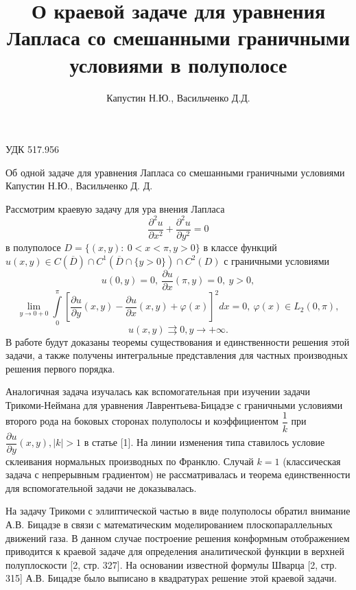 \documentclass[a4paper, 9pt]{article}
\title{О краевой задаче для уравнения Лапласа со смешанными граничными условиями в полуполосе}
\author{Капустин Н.Ю., Васильченко Д.Д.}
\date{}
\begin{document}
	УДК 517.956
	\begin{center}		
		\LARGE{
		 Об одной задаче для уравнения Лапласа со смешанными граничными условиями
		}
		\newline
		\large{Капустин Н.Ю., Васильченко Д. Д.}
		
	\end{center}
	\par
	Рассмотрим краевую задачу для ура внения Лапласа
	\begin{equation}
		\dfrac{\partial^2 u}{\partial x^2} +\dfrac{\partial^2 u}{\partial y^2} = 0
	\end{equation}
	в полуполосе $D = \{(x,y) :\  0 < x < \pi, y > 0\}$	в классе функций $u(x,y) \in C(\overline{D}) \cap C^1(\overline{D} \cap \{y > 0\}) \cap C^2 (D)$ \newline
	с граничными условиями
	\begin{equation}
		u(0, y) = 0, \ \dfrac{\partial u}{\partial x} (\pi, y) = 0, \ y > 0, 
	\end{equation}
	\begin{equation}
		\lim\limits_{y \to 0 + 0} \int\limits_0^\pi \left[\dfrac{\partial u}{\partial y}(x,y) - \dfrac{\partial u}{\partial x}(x,y) + \varphi(x) \right]^2 dx = 0, \ \varphi(x) \in L_2(0,\pi) , 
	\end{equation}
	\begin{equation}
		u(x,y) \rightrightarrows 0, y \to +\infty. 
	\end{equation}
	В работе будут доказаны теоремы существования и единственности решения
	этой задачи, а также получены интегральные представления для частных
	производных решения первого порядка.
	
	Аналогичная задача изучалась как вспомогательная при изучении задачи Трикоми-Неймана
	для уравнения Лаврентьева-Бицадзе с граничными условиями второго рода на боковых сторонах
	полуполосы и коэффициентом $\dfrac{1}{k}$ при
	$\dfrac{\partial u}{\partial y}(x,y), \vert k\vert>1 $ в статье [1].
	На линии изменения типа ставилось условие склеивания нормальных производных
	по Франклю. Случай $k=1$ (классическая задача с непрерывным градиентом)
	не рассматривалась и теорема единственности для вспомогательной задачи
	не доказывалась.
	
	На задачу Трикоми с эллиптической частью в виде полуполосы обратил внимание
	А.В. Бицадзе в связи с математическим моделированием плоскопараллельных
	движений газа. В данном случае построение решения конформным отображением
	приводится к краевой задаче для определения аналитической функции в верхней
	полуплоскости [2, стр. 327]. На основании известной формулы Шварца [2, стр. 315]
	А.В. Бицадзе было выписано в квадратурах решение этой краевой задачи. 
	
\end{document}
